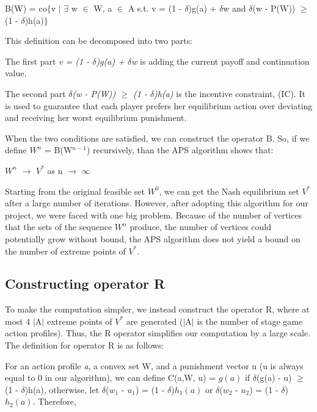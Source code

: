 \documentclass{article}
\begin{document}
	B(W) = co$\{$v $\mid$ $\exists$ w $\in$ W, a $\in$ A s.t. v = (1 - $\delta$)g(a) + $\delta$w and $\delta$(w - P(W)) $\geq$ (1 - $\delta$)h(a)$\}$
	
	This definition can be decomposed into two parts:
	
	The first part \textit{v = (1 - $\delta$)g(a) + $\delta$w} is adding the current payoff and continuation value. 
	
	The second part \textit{$\delta$(w - P(W)) $\geq$ (1 - $\delta$)h(a)} is the incentive constraint,  (IC). It is used to guarantee that each player prefers her equilibrium action over deviating and receiving her worst equilibrium punishment. 

	When the two conditions are satisfied, we can construct the operator B. So, if we define $W^n$ = B(W$^{n-1}$) recursively, than the APS algorithm shows that:
	
\begin{center}
$W^n$ $\rightarrow$ $V^*$ as n $\rightarrow$ $\infty$
\end{center}

	Starting from the original feasible set $W^0$, we can get the Nash equilibrium set $V^*$ after a large number of iterations. However, after adopting this algorithm for our project, we were faced with one big problem. Because of the number of vertices that the sets of the sequence ${W^n}$ produce, the number of vertices could potentially grow without bound, the APS algorithm does not yield a bound on the number of extreme points of $V^*$. 
	
\subsection{Constructing operator R}
\label{ssec:subhead}
	
	To make the computation simpler, we instead construct the operator R, where at most 4 $\mid$A$\mid$ extreme points of $V^*$ are generated ($\mid$A$\mid$ is the number of stage game action profiles). Thus, the R operator simplifies our computation by a large scale.  The definition for operator R is as follows:
	
	For an action profile \textit{a}, a convex set W, and a punishment vector u (u is always equal to 0 in our algorithm), we can define C(a,W, u) = ${g(a)}$ if $\delta$(g(a) - u) $\geq$ (1 - $\delta$)h(a), otherwise, let $\delta$($w_1$ - $u_1$) = (1 - $\delta$)$h_1(a)$ or $\delta$($w_2$ - $u_2$) = (1 - $\delta$)$h_2(a)$. Therefore,
	
\end{document}
